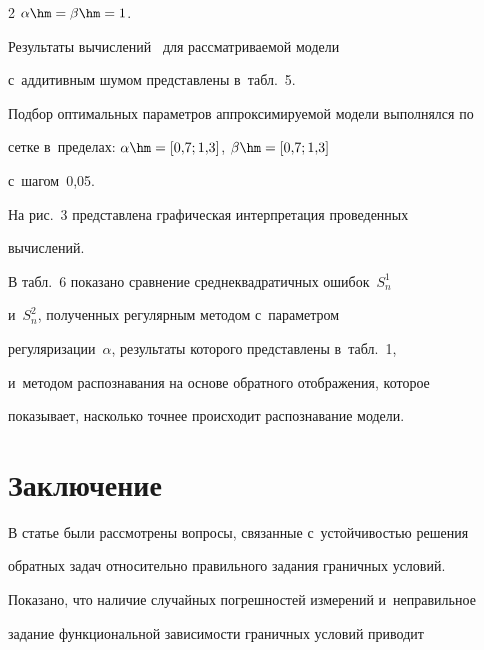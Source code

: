 \begin{multicols}{2}
$\alpha\hm=\beta\hm=1$.

  

  Результаты вычислений~\cite{15-sr} для рассматриваемой модели 

с~аддитивным шумом представлены в~табл.~5. 

  



  

  Подбор оптимальных параметров аппроксимируемой модели выполнялся по 

сетке в~пределах: $\alpha\hm= [0{,}7;1{,}3]$, $\beta\hm= [0{,}7;1{,}3]$ 

с~шагом~0,05.







  

  На рис.~3 представлена графическая интерпретация проведенных 

вычислений.





  

  В табл.~6 показано сравнение среднеквадратичных ошибок~$S_n^1$ 

и~$S_n^2$, полученных регулярным методом с~параметром 

регуляризации~$\alpha$, результаты которого представлены в~табл.~1, 

и~методом распознавания на основе обратного отображения, которое 

показывает, насколько точнее происходит распознавание модели.

  

    \vspace*{-9pt}



\section{Заключение}



  В статье были рассмотрены вопросы, связанные с~устойчивостью решения 

обратных задач относительно правильного задания граничных условий. 



Показано, что наличие случайных погрешностей измерений и~неправильное 

задание функциональной зависимости граничных условий приводит 


\end{multicols}
